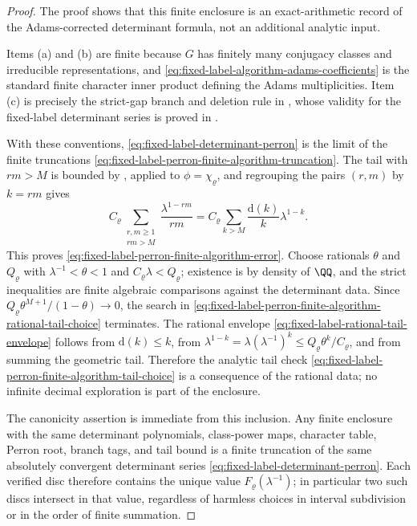 \begin{proof}
  The proof shows that this finite enclosure is an exact-arithmetic record of the
  Adams-corrected determinant formula, not an additional analytic input.

  Items (a) and (b) are finite because \(G\) has finitely many conjugacy
  classes and irreducible representations, and
  \eqref{eq:fixed-label-algorithm-adams-coefficients} is the standard
  finite character inner product defining the Adams multiplicities.  Item
  (c) is precisely the strict-gap branch and deletion rule in
  , whose validity for the
  fixed-label determinant series is proved in
  .

  With these conventions, \eqref{eq:fixed-label-determinant-perron} is the
  limit of the finite truncations
  \eqref{eq:fixed-label-perron-finite-algorithm-truncation}.  The tail with
  \(rm>M\) is bounded by
  , applied to
  \(\phi=\chi_\varrho\), and regrouping the pairs \((r,m)\) by
  \(k=rm\) gives
  \[
    C_\varrho
    \sum_{\substack{r,m\ge1\\rm>M}}\frac{\lambda^{1-rm}}{rm}
    =
    C_\varrho\sum_{k>M}\frac{\mathrm d(k)}{k}\lambda^{1-k}.
  \]
  This proves \eqref{eq:fixed-label-perron-finite-algorithm-error}.  Choose
  rationals \(\theta\) and \(Q_\varrho\) with
  \(\lambda^{-1}<\theta<1\) and \(C_\varrho\lambda<Q_\varrho\); existence is by
  density of \(\QQ\), and the strict inequalities are finite algebraic
  comparisons against the determinant data.  Since
  \(Q_\varrho\theta^{M+1}/(1-\theta)\to0\), the search in
  \eqref{eq:fixed-label-perron-finite-algorithm-rational-tail-choice}
  terminates.  The rational envelope
  \eqref{eq:fixed-label-rational-tail-envelope} follows from
  \(\mathrm d(k)\le k\), from
  \(\lambda^{1-k}=\lambda(\lambda^{-1})^k\le Q_\varrho\theta^k/C_\varrho\),
  and from summing the geometric tail.  Therefore the analytic tail check
  \eqref{eq:fixed-label-perron-finite-algorithm-tail-choice} is a consequence
  of the rational data; no infinite decimal exploration is part of the
  enclosure.

  The canonicity assertion is immediate from this inclusion.  Any finite
  enclosure with the same determinant polynomials, class-power maps, character
  table, Perron root, branch tags, and tail bound is a finite truncation of the
  same absolutely convergent determinant series
  \eqref{eq:fixed-label-determinant-perron}.  Each verified disc therefore
  contains the unique value \(F_\varrho(\lambda^{-1})\); in particular two such
  discs intersect in that value, regardless of harmless choices in interval
  subdivision or in the order of finite summation.


\end{proof}
